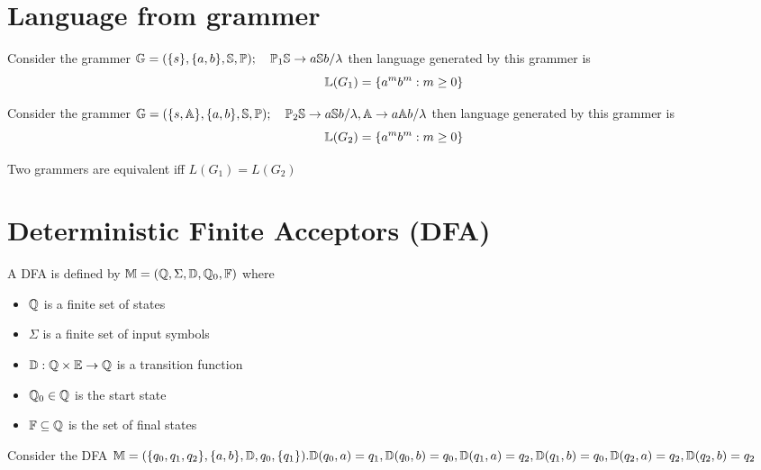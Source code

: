 
\section{Language from grammer}

\begin{example}
    Consider the grammer $ \mathbb{G} = ( \{s\} , \{a, b\} , \mathbb{S}, \mathbb{P} ) ; \quad \mathbb{P}_1 \mathbb{S} \rightarrow a \mathbb{S} b / \lambda $ then language generated by this grammer is $$\mathbb{L}(G_1) = \{ a^mb^m : m \geq 0 \} $$
\end{example}

\begin{example}
    Consider the grammer $ \mathbb{G} = ( \{s, \mathbb{A} \} , \{a, b\} , \mathbb{S}, \mathbb{P} ) ; \quad \mathbb{P}_2 \mathbb{S} \rightarrow a \mathbb{S} b / \lambda, \mathbb{A} \rightarrow a \mathbb{A} b / \lambda $ then language generated by this grammer is $$\mathbb{L}(G_2) = \{ a^mb^m : m \geq 0 \} $$
\end{example}

\begin{definition}{}
    Two grammers are equivalent iff $L(G_1) = L(G_2)$
\end{definition}

\section{Deterministic Finite Acceptors (DFA)}

\begin{definition}{}
    A DFA is defined by $\mathbb{M} = ( \mathbb{Q}, \Sigma, \mathbb{D}, \mathbb{Q}_0, \mathbb{F} )$ where \begin{itemize}
        \item $\mathbb{Q}$ is a finite set of states
        \item $\Sigma$ is a finite set of input symbols
        \item $\mathbb{D} : \mathbb{Q} \times \mathbb{E} \rightarrow \mathbb{Q}$ is a transition function
        \item $\mathbb{Q}_0 \in \mathbb{Q}$ is the start state
        \item $\mathbb{F} \subseteq \mathbb{Q}$ is the set of final states
    \end{itemize}
\end{definition}

\begin{example}
    Consider the DFA $ \mathbb{M} = ( \{q_0, q_1, q_2\} , \{a, b\} , \mathbb{D}, q_0, \{q_1\} ). \\  \mathbb{D}(q_0, a) = q_1, \mathbb{D}(q_0, b) = q_0, \mathbb{D}(q_1, a) = q_2, \mathbb{D}(q_1, b) = q_0, \mathbb{D}(q_2, a) = q_2, \mathbb{D}(q_2, b) = q_2 $
\end{example}

